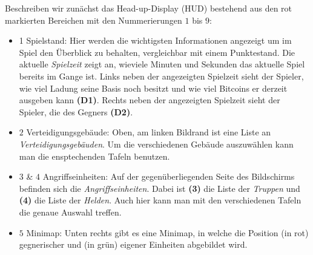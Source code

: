 Beschreiben wir zunächst das Head-up-Display (HUD) bestehend aus den rot markierten Bereichen mit den Nummerierungen $1$ bis $9$:
\begin{itemize}[leftmargin=*]
	\item{1 Spielstand:} Hier werden die wichtigsten Informationen angezeigt um im Spiel den Überblick zu behalten, vergleichbar mit einem Punktestand.
	Die aktuelle \textit{Spielzeit} zeigt an, wieviele Minuten und Sekunden das aktuelle Spiel bereits im Gange ist. Links neben der angezeigten Spielzeit sieht der Spieler, wie viel Ladung seine Basis noch besitzt und wie viel Bitcoins er derzeit ausgeben kann \textbf{(D1)}. Rechts neben der angezeigten Spielzeit sieht der Spieler, die des Gegners \textbf{(D2)}.
	\item {$2$ Verteidigungsgebäude:} Oben, am linken Bildrand ist eine Liste an \textit{Verteidigungsgebäuden}. Um die verschiedenen Gebäude auszuwählen kann man die ensptechenden Tafeln benutzen.
	\item {$3$ \& $4$ Angriffseinheiten:} Auf der gegenüberliegenden Seite des Bildschirms befinden sich die \textit{Angriffseinheiten}. Dabei ist \textbf{(3)} die Liste der \textit{Truppen} und \textbf{(4)} die Liste der \textit{Helden}. Auch hier kann man mit den verschiedenen Tafeln die genaue Auswahl treffen.
	\item {$5$ Minimap:} Unten rechts gibt es eine Minimap, in
	welche die Position (in rot) gegnerischer und (in grün) eigener Einheiten abgebildet wird.

\end{itemize}
